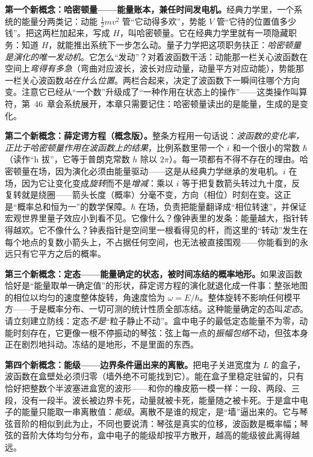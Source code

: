 \begin{mainline}
\textbf{第一个新概念：哈密顿量——能量账本，兼任时间发电机。}经典力学里，一个系统的能量分两类记：动能 \(\tfrac12 mv^{2}\) 管“它动得多欢”，势能 \(V\) 管“它待的位置值多少钱”。把这两栏加起来，写成 \(H\)，叫哈密顿量。它在经典力学里就有一项隐藏职务：知道 \(H\)，就能推出系统下一步怎么动。量子力学把这项职务扶正：\emph{哈密顿量是演化的唯一发动机}。它怎么“发动”？对着波函数干活：动能那一栏关心波函数在空间上\emph{弯得有多急}（弯曲对应波长，波长对应动量，动量平方对应动能），势能那一栏关心波函数\emph{站在什么位置}。两栏合起来，决定了波函数下一瞬间往哪个方向变。注意它已经从“一个数”升级成了“一种作用在状态上的操作”——这类操作叫算符，第~46~章会系统展开，本章只需要记住：哈密顿量读出的是能量，生成的是变化。

\textbf{第二个新概念：薛定谔方程（概念版）。}整条方程用一句话说：\emph{波函数的变化率，正比于哈密顿量作用在波函数上的结果}，比例系数里带一个 \(i\) 和一个很小的常数 \(\hbar\)（读作“h 拔”，它等于普朗克常数 \(h\) 除以 \(2\pi\)）。每一项都有不得不存在的理由。哈密顿量在场，因为演化必须由能量驱动——这是从经典力学继承的发电机。\(i\) 在场，因为它让变化变成\emph{旋转}而不是\emph{增减}：乘以 \(i\) 等于把复数箭头转过九十度，反复转就是绕圈——箭头长度（概率）分毫不变，方向（相位）时刻在变。这正是“概率总和恒为一”的数学保障。\(\hbar\) 在场，负责把能量翻译成“相位转速”，并保证宏观世界里量子效应小到看不见。它像什么？像钟表里的发条：能量越大，指针转得越欢。它不像什么？钟表指针是空间里一根看得见的杆，而这里的“转动”发生在每个地点的复数小箭头上，不占据任何空间，也无法被直接围观——你能看到的永远只有它平方之后的概率。

\textbf{第三个新概念：定态——能量确定的状态，被时间冻结的概率地形。}如果波函数恰好是“能量取单一确定值”的形状，薛定谔方程的演化就退化成一件事：整张地图的相位以均匀的速度整体旋转，角速度恰为 \(\omega=E/\hbar\)。整体旋转不影响任何模平方——于是概率分布、一切可测的统计性质全部冻结。这种能量确定的态叫\emph{定态}。请立刻建立防线：定态\emph{不是}“粒子静止不动”。盒中电子的最低定态能量不为零，动能时刻存在，它更像一根不停振动的琴弦：弦上每一点的\emph{振幅包络}不动，但弦本身正在剧烈地抖动。冻结的是地形，不是里面的东西。

\textbf{第四个新概念：能级——边界条件逼出来的离散。}把电子关进宽度为 \(L\) 的盒子，波函数在盒壁处必须归零（墙外绝不可能找到它）。能在盒子里稳定驻留的，只有恰好把整数个半波塞进盒宽的波形——和你的橡皮筋一模一样：一段、两段、三段，没有一段半。波长被边界卡死，动量就被卡死，能量随之被卡死。于是盒中电子的能量只能取一串离散值：\emph{能级}。离散不是谁的规定，是“墙”逼出来的。它与琴弦音阶的相似到此为止，不同也要说清：琴弦是真实的位移，波函数是概率幅；琴弦的音阶大体均匀分布，盒中电子的能级却按平方散开，越高的能级彼此离得越远。


\end{mainline}
